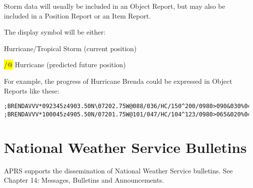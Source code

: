 Storm data will usually be included in an Object Report, but may also be
included in a Position Report or an Item Report.


The display symbol will be either:

\begin{description}
\item \hl{\textbackslash@} Hurricane/Tropical Storm (current position)
\item \hl{/@} Hurricane (predicted future position)
\end{description}

For example, the progress of Hurricane Brenda could be expressed in Object
Reports like these:

\begin{verbatim}
;BRENDAVVV*092345z4903.50N\07202.75W@088/036/HC/150^200/0980>090&030%040
;BRENDAVVV*100045z4905.50N/07201.75W@101/047/HC/104^123/0980>065&020%040
\end{verbatim}


\section {National Weather Service Bulletins}

APRS supports the dissemination of National Weather Service bulletins. See
Chapter 14: Messages, Bulletins and Announcements.




